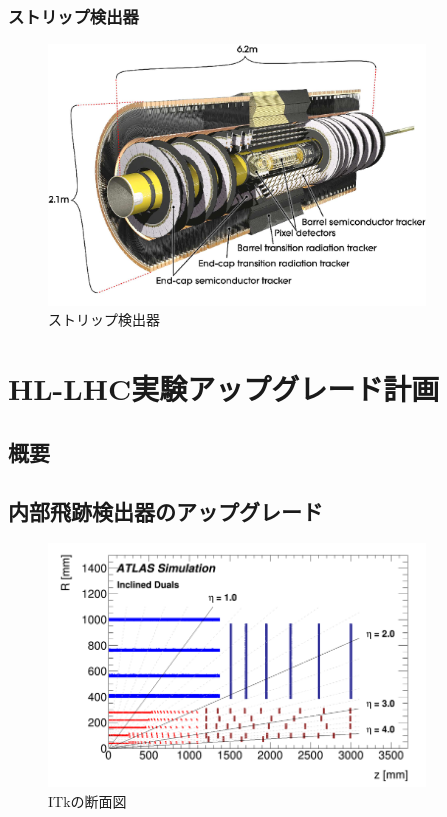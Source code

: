 \subsubsection{ストリップ検出器}

\begin{figure}[bpt]\centering
\includegraphics[width=10cm]{inner_detector}
\caption[ストリップ検出器]{ストリップ検出器\cite{1-2}}
\label{inner_detector}
\end{figure}


\section{HL-LHC実験アップグレード計画}
\subsection{概要}
\subsection{内部飛跡検出器のアップグレード}

\begin{figure}[bpt]\centering
\includegraphics[width=10cm]{itk_cross_section}
\caption[ITkの断面図]{ITkの断面図\cite{1-3}}
\label{itk_cross_section}
\end{figure}

